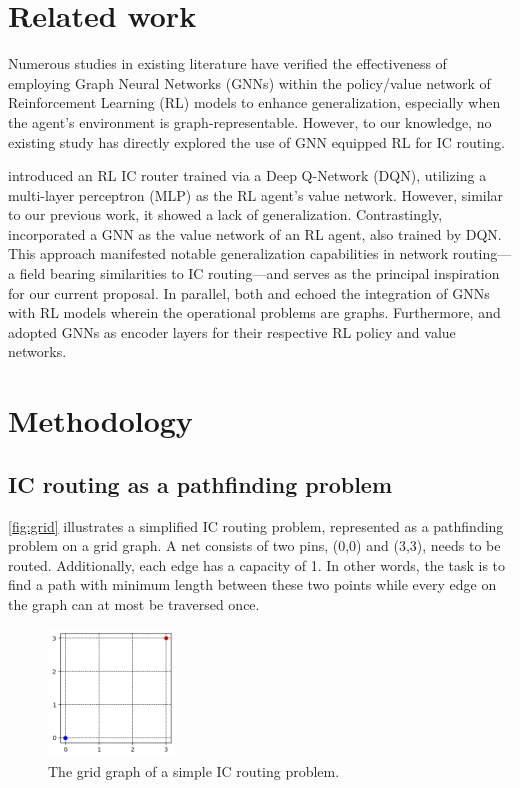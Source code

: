 \documentclass[letterpaper]{article}
\begin{document}
\section{Related work}
Numerous studies in existing literature have verified the effectiveness of
employing Graph Neural Networks (GNNs) within the policy/value network of
Reinforcement Learning (RL) models to enhance generalization, especially when
the agent’s environment is graph-representable. However, to our knowledge, no
existing study has directly explored the use of GNN equipped RL for IC routing.

\cite{Liao2020} introduced an RL IC router trained via a Deep Q-Network (DQN),
utilizing a multi-layer perceptron (MLP) as the RL agent's value network.
However, similar to our previous work, it showed a lack of generalization.
Contrastingly, \cite{Almasan2022} incorporated a GNN as the value network of an
RL agent, also trained by DQN. This approach manifested notable generalization
capabilities in network routing—a field bearing similarities to IC routing—and
serves as the principal inspiration for our current proposal. In parallel, both
\cite{Chen2023} and \cite{Wang2018} echoed the integration of GNNs with RL
models wherein the operational problems are graphs. Furthermore,
\cite{Mirhoseini2021} and \cite{Yue2022} adopted GNNs as encoder layers for
their respective RL policy and value networks.

    
\section{Methodology}

\subsection{IC routing as a pathfinding problem}
\autoref{fig:grid} illustrates a simplified IC routing problem, represented as a
pathfinding problem on a grid graph. A net consists of two pins, (0,0) and
(3,3), needs to be routed. Additionally, each edge has a capacity of 1. In other
words, the task is to find a path with minimum length between these two points
while every edge on the graph can at most be traversed once.

\begin{figure}[h!]
    \centering
    \includegraphics[width=0.3\textwidth]{figure/grid_grap.png}
    \caption{The grid graph of a simple IC routing problem.}
    \label{fig:grid}
\end{figure}
\end{document}
